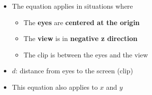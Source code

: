     \begin{itemize}
      \item The equation applies in situations where
      \begin{itemize}
        \item The \textbf{eyes} are \textbf{centered at the origin}
        \item The \textbf{view} is in \textbf{negative z direction}
        \item The clip is between the eyes and the view
      \end{itemize}

      \item $ d $: distance from eyes to the screen (clip)
      \item This equation also applies to $ x $ and $ y $
    \end{itemize}
